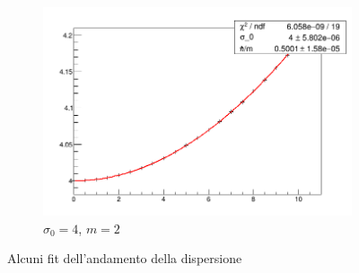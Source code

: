 \begin{figure}[htb]
\begin{subfigure}[b]{0.3\textwidth}
		\includegraphics[width=\linewidth]{IMG/dispersione_m2s4}
		\caption{$\sigma_0=4$, $m=2$}
	\end{subfigure}
	\caption{Alcuni fit dell'andamento della dispersione}\label{fig:dispersioneFitSigma4}
\end{figure}

